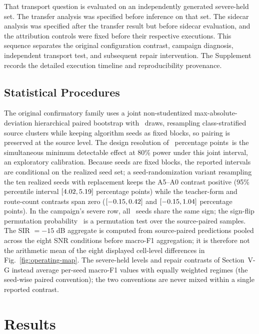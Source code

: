 \documentclass[letterpaper,journal]{IEEEtran}
\newcommand{\pp}{percentage points}
\begin{document}
That transport question is evaluated on an independently generated
severe-held set. The transfer analysis was specified before inference on that
set. The sidecar analysis was specified after the transfer result but before
sidecar evaluation, and the attribution controls were fixed before their
respective executions. This sequence separates the original configuration
contrast, campaign diagnosis, independent transport test, and subsequent
repair intervention. The Supplement records the detailed execution timeline
and reproducibility provenance.

\subsection{Statistical Procedures}
The original confirmatory family uses a joint non-studentized max-absolute-deviation
hierarchical paired bootstrap with \ProtocolBootstrapDraws\ draws, resampling
class-stratified source clusters while keeping algorithm seeds as fixed
blocks, so pairing is preserved at the source level. The design resolution of
\DesignResolution\ \pp\ is the simultaneous minimum detectable effect at 80\%
power under this joint interval, an exploratory calibration. Because seeds are fixed blocks, the reported
intervals are conditional on the realized seed set; a seed-randomization
variant resampling the ten realized seeds with replacement keeps the A5--A0
contrast positive (95\% percentile interval
$[4.02,5.19]$ \pp) while the teacher-form and
route-count contrasts span zero
($[-0.15,0.42]$ and
$[-0.15,1.04]$ \pp). In the campaign's severe row, all
\SevereGainIqformerPositiveSeeds\ seeds share the same sign; the sign-flip
permutation probability \SevereGainIqformerSignFlipP\ is a permutation test
over the source-paired samples. The SIR $=-15$ dB aggregate is computed from
source-paired predictions pooled across the eight SNR conditions before
macro-F1 aggregation; it is therefore not the arithmetic mean of the eight
displayed cell-level differences in Fig.~\ref{fig:operating-map}. The
severe-held levels and repair contrasts of Section~V-G instead average
per-seed macro-F1 values with equally weighted regimes (the seed-wise paired
convention); the two conventions are never mixed within a single reported
contrast.

\section{Results}
\end{document}

